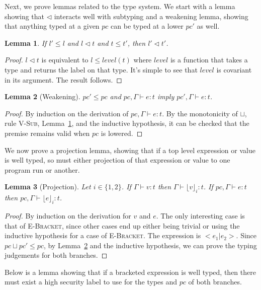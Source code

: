 \documentclass[a4paper,twocolumn]{article}
\newcommand{\typeRule}[3]{#1 \vdash #2 \colon #3}
\newcommand{\guards}[0]{\lhd}
\newcommand{\lift}[1]{\lfloor #1 \rfloor}
\theoremstyle{plain}
\newtheorem{lemma}{Lemma}
\theoremstyle{definition}
\begin{document}
Next, we prove lemmas related to the type system.  We start with a lemma showing
that $\guards$ interacts well with subtyping and a weakening lemma, showing that
anything typed at a given $pc$ can be typed at a lower $pc'$ as well.

\begin{lemma}
  \label{lem:guard_subtype}
  If $l' \leq l$ and $l \guards t$ and $t \leq t'$, then $l' \guards t'$.
\end{lemma}
\begin{proof}
  $l \guards t$ is equivalent to $l \leq level(t)$ where $level$ is a function
  that takes a type and returns the label on that type.  It's simple to see that
  $level$ is covariant in its argument.  The result follows.
\end{proof}

\begin{lemma}[Weakening]
  \label{lem:weakening}
  $pc' \leq pc$ and $\typeRule{pc, \Gamma}{e}{t}$ imply $\typeRule{pc',
  \Gamma}{e}{t}$.
\end{lemma}
\begin{proof}
  By induction on the derivation of $\typeRule{pc, \Gamma}{e}{t}$.  By the
  monotonicity of $\sqcup$, rule \textsc{V-Sub}, Lemma~\ref{lem:guard_subtype},
  and the inductive hypothesis, it can be checked that the premise remains valid
  when $pc$ is lowered.
\end{proof}

We now prove a projection lemma, showing that if a top level expression or value
is well typed, so must either projection of that expression or value to one
program run or another.

\begin{lemma}[Projection]
  \label{lem:projection}
  Let $i \in \{1, 2\}$.  If $\typeRule{\Gamma}{v}{t}$ then
  $\typeRule{\Gamma}{\lift{v}_i}{t}$.  If $\typeRule{pc, \Gamma}{e}{t}$ then
  $\typeRule{pc, \Gamma}{\lift{e}_i}{t}$.
\end{lemma}
\begin{proof}
  By induction on the derivation for $v$ and $e$.  The only interesting case is
  that of \textsc{E-Bracket}, since other cases end up either being trivial or
  using the inductive hypothesis for a case of \textsc{E-Bracket}.  The
  expression is $<e_1 | e_2>$.  Since $pc \sqcup pc' \leq pc$, by
  Lemma~\ref{lem:weakening} and the inductive hypothesis, we can prove the
  typing judgements for both branches.
\end{proof}

Below is a lemma showing that if a bracketed expression is well typed, then
there must exist a high security label to use for the types and $pc$ of both
branches.
\end{document}
